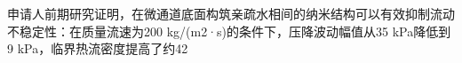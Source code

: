 申请人前期研究证明，在微通道底面构筑亲疏水相间的纳米结构可以有效抑制流动不稳定性：在质量流速为200 kg/(m2·s)的条件下，压降波动幅值从35 kPa降低到9 kPa，临界热流密度提高了约42%
